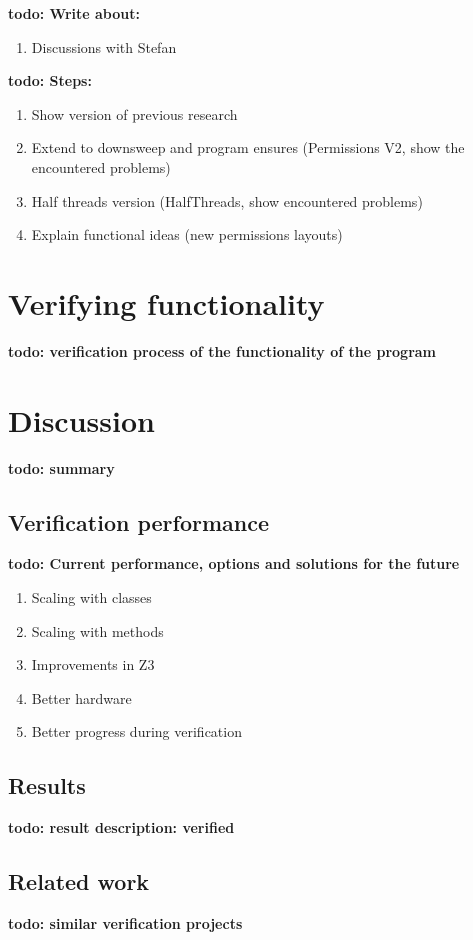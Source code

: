 \documentclass[a4paper]{article}
\newcommand{\todo}[1]{{\color{BurntOrange}\sffamily\textbf{todo: #1}\par}}
\begin{document}
\todo{Write about:}
\begin{enumerate}
	\item Discussions with Stefan
\end{enumerate}


\vspace{3cm}
\todo{Steps:}
\begin{enumerate}
	\item Show version of previous research
	\item Extend to downsweep and program ensures (Permissions V2, show the encountered problems)
	\item Half threads version (HalfThreads, show encountered problems)
	\item Explain functional ideas (new permissions layouts)
\end{enumerate}


\section{Verifying functionality}
\todo{verification process of the functionality of the program}


\section{Discussion}
\todo{summary}

\subsection{Verification performance}
\todo{Current performance, options and solutions for the future}
\begin{enumerate}
	\item Scaling with classes
	\item Scaling with methods
	\item Improvements in Z3
	\item Better hardware
	\item Better progress during verification
\end{enumerate}

\subsection{Results}

\todo{result description: verified}

\subsection{Related work}
\todo{similar verification projects}
\end{document}
